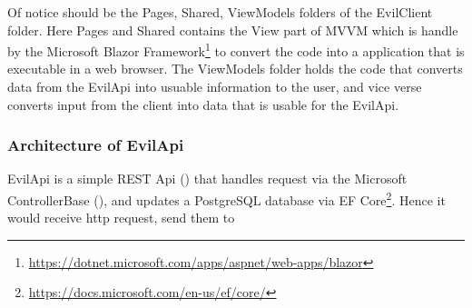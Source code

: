 \documentclass[report/main.tex]{subfiles}
\begin{document}
            Of notice should be the Pages, Shared, ViewModels folders of the EvilClient folder. Here Pages and Shared contains the View part of MVVM which is handle by the Microsoft Blazor Framework\footnote{\hyperlink{https://dotnet.microsoft.com/apps/aspnet/web-apps/blazor}{https://dotnet.microsoft.com/apps/aspnet/web-apps/blazor}} to convert the code into a application that is executable in a web browser. The ViewModels folder holds the code that converts data from the EvilApi into usuable information to the user, and vice verse converts input from the client into data that is usable for the EvilApi.

        \subsubsection{Architecture of EvilApi}
        \label{subsubsec:architecture-of-evilApi}
            EvilApi is a simple REST Api (\cite{rest}) that handles request via the Microsoft ControllerBase (\cite{ms-web-api}), and updates a PostgreSQL database via EF Core\footnote{\hyperlink{https://docs.microsoft.com/en-us/ef/core/}{https://docs.microsoft.com/en-us/ef/core/}}. Hence it would receive http request, send them to
    
\end{document}
